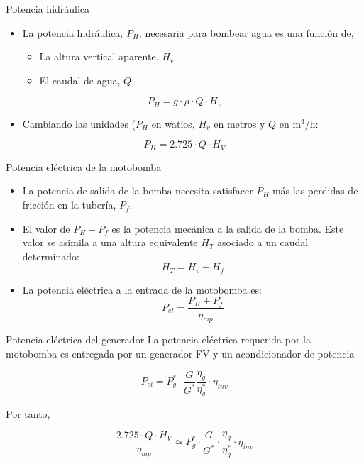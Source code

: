 \documentclass[xcolor={usenames,svgnames,dvipsnames}]{beamer}
\begin{document}
\begin{frame}[label={sec:org1c88ccb}]{Potencia hidráulica}
\begin{itemize}
\item La \alert{potencia hidráulica}, \(P_{H}\), necesaria para bombear agua es una función de,

\begin{itemize}
\item La \alert{altura vertical aparente}, \(H_{v}\)

\item El \alert{caudal de agua}, \(Q\)
\end{itemize}
\end{itemize}

$$P_{H}=g\cdot\rho\cdot Q\cdot H_{v}$$

\begin{itemize}
\item Cambiando las unidades (\(P_{H}\) en watios, \(H_{v}\) en metros y \(Q\) en \(\si{\meter\cubed\per\hour}\):
\end{itemize}
$$P_{H}=2.725\cdot Q\cdot H_{V}$$
\end{frame}

\begin{frame}[label={sec:orgb864f26}]{Potencia eléctrica de la motobomba}
\begin{itemize}
\item La potencia de salida de la bomba necesita satisfacer \(P_{H}\) más las \alert{perdidas de fricción en la tubería}, \(P_{f}\).

\item El valor de \(P_{H}+P_{f}\) es la \alert{potencia mecánica a la salida de la bomba}. Este valor se asimila a una altura equivalente \(H_{T}\) asociado a un caudal determinado:$$H_{T}=H_{v}+H_{f}$$

\item La \alert{potencia eléctrica a la entrada de la motobomba} es: $$P_{el}=\frac{P_{H}+P_{f}}{\eta_{mp}}$$
\end{itemize}
\end{frame}

\begin{frame}[label={sec:orgbd85639}]{Potencia eléctrica del generador}
La potencia eléctrica requerida por la motobomba es entregada por un generador FV y un acondicionador de potencia

$$P_{el}=P_{g}^{*}\cdot\frac{G}{G^{*}}\frac{\eta_{g}}{\eta_{g}^{*}}\cdot\eta_{inv}$$

Por tanto,

$$ \frac{2.725\cdot Q\cdot H_{V}}{\eta_{mp}} \simeq P_{g}^{*}\cdot\frac{G}{G^{*}}\cdot\frac{\eta_{g}}{\eta_{g}^{*}}\cdot\eta_{inv}$$ 
\end{frame}
\end{document}
